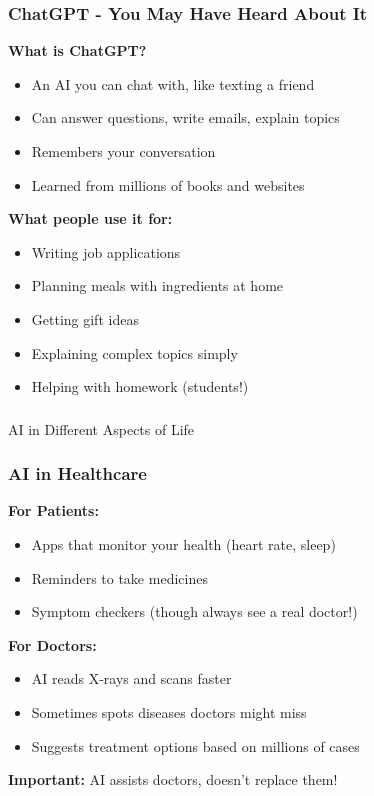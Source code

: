 \begin{frame}[fragile]\frametitle{ChatGPT - You May Have Heard About It}

{\bf What is ChatGPT?}
\begin{itemize}
\item An AI you can chat with, like texting a friend
\item Can answer questions, write emails, explain topics
\item Remembers your conversation
\item Learned from millions of books and websites
\end{itemize}

{\bf What people use it for:}
\begin{itemize}
\item Writing job applications
\item Planning meals with ingredients at home
\item Getting gift ideas
\item Explaining complex topics simply
\item Helping with homework (students!)
\end{itemize}
\end{frame}

\begin{frame}[fragile]\frametitle{}
\begin{center}
{\Large AI in Different Aspects of Life}
\end{center}
\end{frame}

\begin{frame}[fragile]\frametitle{AI in Healthcare}

{\bf For Patients:}
\begin{itemize}
\item Apps that monitor your health (heart rate, sleep)
\item Reminders to take medicines
\item Symptom checkers (though always see a real doctor!)
\end{itemize}

{\bf For Doctors:}
\begin{itemize}
\item AI reads X-rays and scans faster
\item Sometimes spots diseases doctors might miss
\item Suggests treatment options based on millions of cases
\end{itemize}

{\bf Important:} AI assists doctors, doesn't replace them!
\end{frame}

